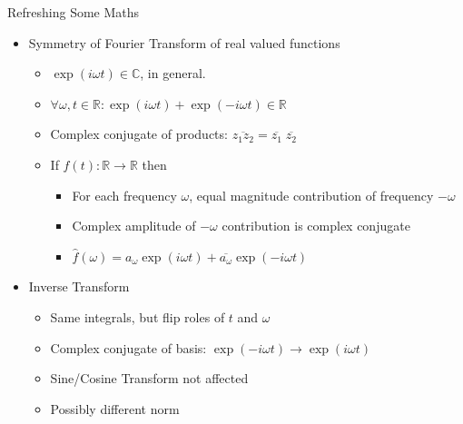 \begin{frame}{Refreshing Some Maths}
%
\begin{itemize}
\item Symmetry of Fourier Transform of real valued functions
	\begin{itemize}
	\item $\exp(i\omega t) \in \mathbb{C}$, in general.
	\item $\forall \omega, t \in \mathbb{R}: \exp(i\omega t) + \exp(-i\omega t)\in \mathbb{R}$
	\item Complex conjugate of products: $\overline{z_1 z_2} = \overline{z_1} \; \overline{z_2}$
	\item[\Thus] If $f(t): \mathbb{R} \to \mathbb{R}$ then
		\begin{itemize}
		\item For each frequency $\omega$, equal magnitude contribution of frequency $-\omega$
		\item Complex amplitude of $-\omega$ contribution is complex conjugate
		\item $\hat{f}(\omega) = a_\omega \exp(i\omega t) + \overline{a_\omega} \exp(-i\omega t)$
		\end{itemize}
	\end{itemize}
\item Inverse Transform
	\begin{itemize}
	\item Same integrals, but flip roles of $t$ and $\omega$
	\item Complex conjugate of basis: $\exp(-i\omega t) \to \exp(i\omega t)$
	\item Sine/Cosine Transform not affected
	\item Possibly different norm
	\end{itemize}
\end{itemize}
%
\end{frame}


